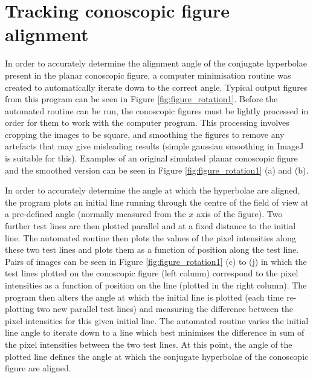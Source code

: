 \section{Tracking conoscopic figure alignment}
In order to accurately determine the alignment angle of the conjugate hyperbolae present in the planar conoscopic figure, a computer minimisation routine was created to automatically iterate down to the correct angle. Typical output figures from this program can be seen in Figure \ref{fig:figure_rotation1}. Before the automated routine can be run, the conoscopic figures must be lightly processed in order for them to work with the computer program. This processing involves cropping the images to be square, and smoothing the figures to remove any artefacts that may give misleading results (simple gaussian smoothing in ImageJ is suitable for this). Examples of an original simulated planar conoscopic figure and the smoothed version can be seen in Figure \ref{fig:figure_rotation1} (a) and (b). 

In order to accurately determine the angle at which the hyperbolae are aligned, the program plots an initial line running through the centre of the field of view at a pre-defined angle (normally measured from the $x$ axis of the figure). Two further test lines are then plotted parallel and at a fixed distance to the initial line. The automated routine then plots the values of the pixel intensities along these two test lines and plots them as a function of position along the test line. Pairs of images can be seen in Figure \ref{fig:figure_rotation1} (c) to (j) in which the test lines plotted on the conoscopic figure (left column) correspond to the pixel intensities as a function of position on the line (plotted in the right column). The program then alters the angle at which the initial line is plotted (each time re-plotting two new parallel test lines) and measuring the difference between the pixel intensities for this given initial line. The automated routine varies the initial line angle to iterate down to a line which best minimises the difference in sum of the pixel intensities between the two test lines. At this point, the angle of the plotted line defines the angle at which the conjugate hyperbolae of the conoscopic figure are aligned.

